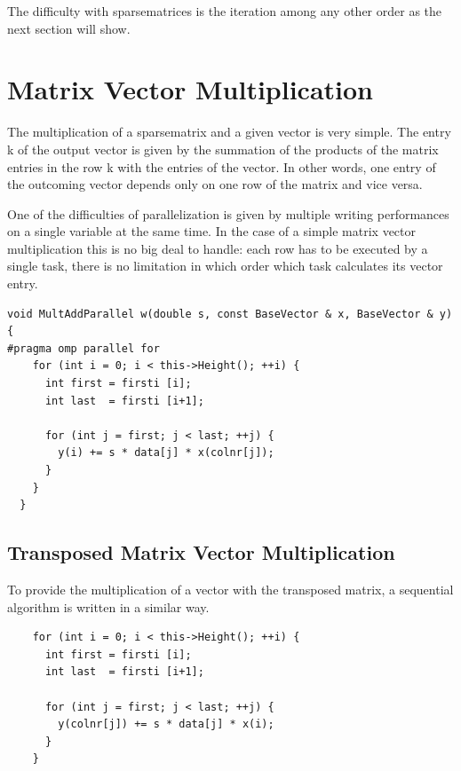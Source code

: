 \documentclass[a4paper,11pt]{scrartcl}
\begin{document}
The difficulty with sparsematrices is the iteration among any other order as
the next section will show.

\section{Matrix Vector Multiplication}
The multiplication of a sparsematrix and a given vector is very simple.
The entry k of the output vector is given by the summation of the products
of the matrix entries in the row k with the entries of the vector. In other
words, one entry of the outcoming vector depends only on one row of the matrix
and vice versa.

One of the difficulties of parallelization is given by multiple writing
performances on a single variable at the same time. In the case of a simple
matrix vector multiplication this is no big deal to handle: each row has to be
executed by a single task, there is no limitation in which order which task
calculates its vector entry.

\begin{lstlisting}
void MultAddParallel w(double s, const BaseVector & x, BaseVector & y)
{
#pragma omp parallel for
    for (int i = 0; i < this->Height(); ++i) {
      int first = firsti [i];
      int last  = firsti [i+1];

      for (int j = first; j < last; ++j) {
        y(i) += s * data[j] * x(colnr[j]);
      }
    }
  }

\end{lstlisting}

\subsection{Transposed Matrix Vector Multiplication}
To provide the multiplication of a vector with the transposed matrix, a
sequential algorithm is written in a similar way.

\begin{lstlisting}
    for (int i = 0; i < this->Height(); ++i) {
      int first = firsti [i];
      int last  = firsti [i+1];

      for (int j = first; j < last; ++j) {
        y(colnr[j]) += s * data[j] * x(i);
      }
    }
\end{lstlisting}
\end{document}
